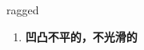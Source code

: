 
\begin{frame}
{\huge ragged}
\begin{center}
\begin{enumerate}\Large
  \item \textbf{凹凸不平的，不光滑的}
\end{enumerate}
\end{center}
\end{frame}
